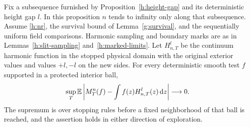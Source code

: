 \begin{proposition}\label{h:stopped}
Fix a subsequence furnished by Proposition~\ref{h:height-gap} and its
deterministic height gap $l$. In this proposition $n$ tends to infinity
only along that subsequence. Assume \eqref{h:nr}, the survival bound
of Lemma~\ref{g:survival}, and the sequentially uniform field
comparisons. Harmonic sampling and boundary marks are as in
Lemmas~\ref{h:slit-sampling} and~\ref{h:marked-limits}.
Let $H^l_{n,T}$ be the continuum harmonic
function in the stopped physical domain with the original exterior
values and values $+l,-l$ on the new sides. For every deterministic
smooth test $f$ supported in a protected interior ball,
\begin{equation}\label{h:stopped-observable}
 \sup_T\mathbb E\left|M^n_T(f)-\int f(z)H^l_{n,T}(z)\,\mathrm d z\right|
 \longrightarrow0.
\end{equation}
The supremum is over stopping rules before a fixed neighborhood of
that ball is reached, and the assertion holds in either direction
of exploration.
\end{proposition}
